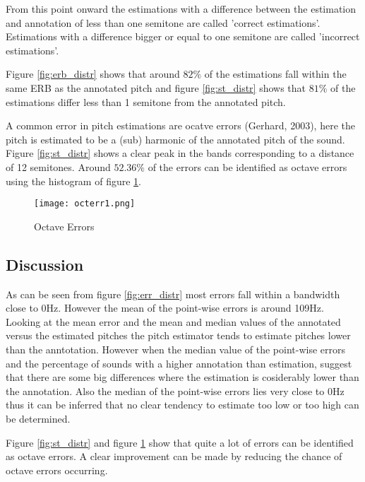\documentclass{article}
\begin{document}
From this point onward the estimations with a difference between the estimation and annotation of less than one semitone are called 'correct estimations'. Estimations with a difference bigger or equal to one semitone are called 'incorrect estimations'.

Figure \ref{fig:erb_distr} shows that around $82\%$ of the estimations fall within the same ERB as the annotated pitch and figure \ref{fig:st_distr} shows that $81\%$ of the estimations differ less than 1 semitone from the annotated pitch.

A common error in pitch estimations are ocatve errors (Gerhard, 2003), here the pitch is estimated to be a (sub) harmonic of the annotated pitch of the sound. Figure \ref{fig:st_distr} shows a clear peak in the bands corresponding to a distance of 12 semitones. Around $52.36\%$ of the errors can be identified as octave errors using the histogram of figure \ref{fig:octerr1}.

\begin{figure}
    \centering
    \texttt{[image: octerr1.png]}
    \caption{Octave Errors}
    \label{fig:octerr1}
\end{figure}

\subsection{Discussion}
As can be seen from figure \ref{fig:err_distr} most errors fall within a bandwidth close to 0Hz. However the mean of the point-wise errors is around 109Hz. Looking at the mean error and the mean and median values of the annotated versus the estimated pitches the pitch estimator tends to estimate pitches lower than the anntotation. However when the median value of the point-wise errors and the percentage of sounds with a higher annotation than estimation, suggest that there are some big differences where the estimation is cosiderably lower than the annotation. Also the median of the point-wise errors lies very close to 0Hz thus it can be inferred that no clear tendency to estimate too low or too high can be determined.

Figure \ref{fig:st_distr} and figure \ref{fig:octerr1} show that quite a lot of errors can be identified as octave errors. A clear improvement can be made by reducing the chance of octave errors occurring.

\end{document}
